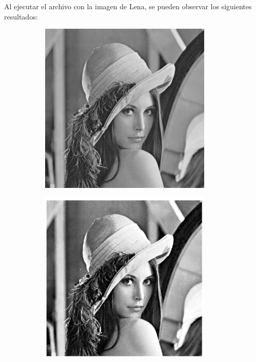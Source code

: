 \documentclass{article}
\begin{document}
Al ejecutar el archivo con la imagen de Lena, se pueden observar los siguientes resultados:
\begin{figure}[H]
    \begin{subfigure}{0.5\textwidth}
        \includegraphics[width=0.9\textwidth]{lena.png} %
    \end{subfigure}\hfill
    \begin{subfigure}{0.5\textwidth}
        \includegraphics[width=0.9\textwidth]{lenaEq.png} %
    \end{subfigure}
\end{figure}
\end{document}

